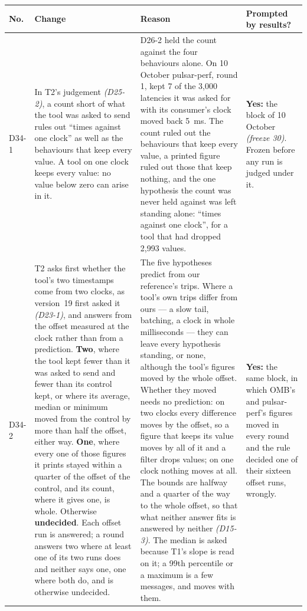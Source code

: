 \documentclass[11pt]{article}
\newcommand{\gl}[1]{{\color{soft}\itshape\small (#1)}}
\begin{document}
{\small
\begin{longtable}{@{}p{1.1cm} >{\raggedright\arraybackslash}p{6.1cm} >{\raggedright\arraybackslash}p{6.0cm} >{\raggedright\arraybackslash}p{2.2cm}@{}}
\toprule
\textbf{No.} & \textbf{Change} & \textbf{Reason} & \textbf{Prompted by results?} \\
\midrule
\endhead
D34-1 & In T2's judgement \gl{D25-2}, a count short of what the tool was asked to send rules out ``times against one clock'' as well as the behaviours that keep every value. A tool on one clock keeps every value: no value below zero can arise in it. & D26-2 held the count against the four behaviours alone. On 10 October pulsar-perf, round 1, kept 7 of the 3,000 latencies it was asked for with its consumer's clock moved back 5~ms. The count ruled out the behaviours that keep every value, a printed figure ruled out those that keep nothing, and the one hypothesis the count was never held against was left standing alone: ``times against one clock'', for a tool that had dropped 2,993 values. & \textbf{Yes:} the block of 10 October \gl{freeze 30}. Frozen before any run is judged under it. \\
D34-2 & T2 asks first whether the tool's two timestamps come from two clocks, as version~19 first asked it \gl{D23-1}, and answers from the offset measured at the clock rather than from a prediction. \textbf{Two}, where the tool kept fewer than it was asked to send and fewer than its control kept, or where its average, median or minimum moved from the control by more than half the offset, either way. \textbf{One}, where every one of those figures it prints stayed within a quarter of the offset of the control, and its count, where it gives one, is whole. Otherwise \textbf{undecided}. Each offset run is answered; a round answers two where at least one of its two runs does and neither says one, one where both do, and is otherwise undecided. & The five hypotheses predict from our reference's trips. Where a tool's own trips differ from ours --- a slow tail, batching, a clock in whole milliseconds --- they can leave every hypothesis standing, or none, although the tool's figures moved by the whole offset. Whether they moved needs no prediction: on two clocks every difference moves by the offset, so a figure that keeps its value moves by all of it and a filter drops values; on one clock nothing moves at all. The bounds are halfway and a quarter of the way to the whole offset, so that what neither answer fits is answered by neither \gl{D15-3}. The median is asked because T1's slope is read on it; a 99th percentile or a maximum is a few messages, and moves with them. & \textbf{Yes:} the same block, in which OMB's and pulsar-perf's figures moved in every round and the rule decided one of their sixteen offset runs, wrongly. \\

\end{longtable}}
\end{document}
